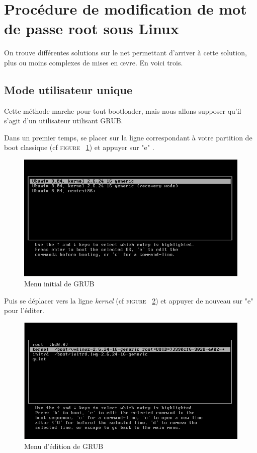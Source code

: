 \section{Procédure de modification de mot de passe root sous Linux}
On trouve différentes solutions sur le net permettant d'arriver à cette solution, plus ou moins complexes de mises en \oe{}vre. En voici trois. 

\subsection{Mode utilisateur unique}
Cette méthode marche pour tout bootloader, mais nous allons supposer qu'il s'agit d'un utilisateur utilisant GRUB.

Dans un premier temps, se placer sur la ligne correspondant à votre partition de boot classique (cf \textsc{figure ~\ref{fig:grub-boot-menu}}) et appuyer sur "e" .

\begin{figure}[h!]
	\centering
		\includegraphics[width=1.00\textwidth]{boot/grub-boot-menu.png}
	\caption{Menu initial de GRUB}
	\label{fig:grub-boot-menu}
\end{figure}

Puis se déplacer vers la ligne \emph{kernel} (cf \textsc{figure ~\ref{fig:edit-grub-boot-option}}) et appuyer de nouveau sur "e" pour l'éditer. 

\begin{figure}[h!]
	\centering
		\includegraphics[width=1.00\textwidth]{boot/edit-grub-boot-option.png}
	\caption{Menu d'édition de GRUB}
	\label{fig:edit-grub-boot-option}
\end{figure}

